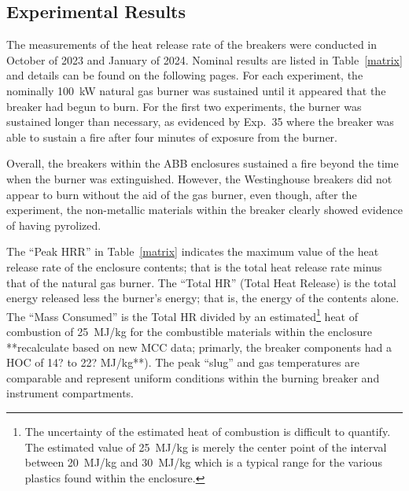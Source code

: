 \subsection{Experimental Results}
\label{sec:results}
The measurements of the heat release rate of the breakers were conducted in October of 2023 and January of 2024. Nominal results are listed in Table~\ref{matrix} and details can be found on the following pages. For each experiment, the nominally 100~kW natural gas burner was sustained until it appeared that the breaker had begun to burn. For the first two experiments, the burner was sustained longer than necessary, as evidenced by Exp.~35 where the breaker was able to sustain a fire after four minutes of exposure from the burner.

Overall, the breakers within the ABB enclosures sustained a fire beyond the time when the burner was extinguished. However, the Westinghouse breakers did not appear to burn without the aid of the gas burner, even though, after the experiment, the non-metallic materials within the breaker clearly showed evidence of having pyrolized.

The ``Peak HRR'' in Table~\ref{matrix} indicates the maximum value of the heat release rate of the enclosure contents; that is the total heat release rate minus that of the natural gas burner. The ``Total HR'' (Total Heat Release) is the total energy released less the burner's energy; that is, the energy of the contents alone. The ``Mass Consumed'' is the Total HR divided by an estimated\footnote{The uncertainty of the estimated heat of combustion is difficult to quantify. The estimated value of 25~MJ/kg is merely the center point of the interval between 20~MJ/kg and 30~MJ/kg which is a typical range for the  various plastics found within the enclosure.} heat of combustion of 25~MJ/kg for the combustible materials within the enclosure **recalculate based on new MCC data; primarly, the breaker components had a HOC of 14? to 22? MJ/kg**). The peak ``slug'' and gas temperatures are comparable and represent uniform conditions within the burning breaker and instrument compartments.


